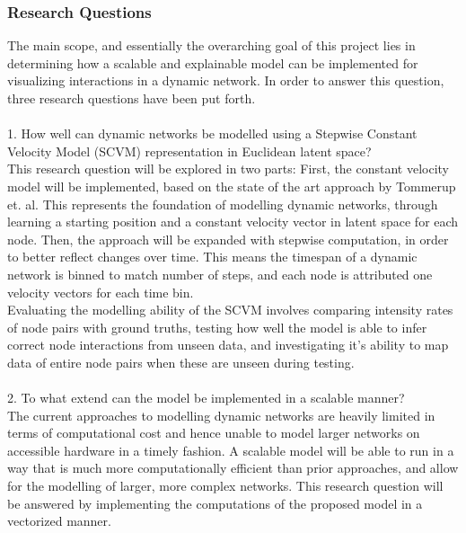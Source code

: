 \subsubsection{Research Questions} 
\label{sec:Intro:ResearchQs}
The main scope, and essentially the overarching goal of this project lies in determining how a scalable and explainable model can be implemented for visualizing interactions in a dynamic network.
In order to answer this question, three research questions have been put forth.
\\\\
1. How well can dynamic networks be modelled using a Stepwise Constant Velocity Model (SCVM) representation in Euclidean latent space?
\\
This research question will be explored in two parts:
First, the constant velocity model will be implemented, based on the state of the art approach by Tommerup et. al. \cite{Tommerup2021LearningNetworks}
This represents the foundation of modelling dynamic networks, through learning a starting position and a constant velocity vector in latent space for each node.
Then, the approach will be expanded with stepwise computation, in order to better reflect changes over time.
This means the timespan of a dynamic network is binned to match number of steps, and each node is attributed one velocity vectors for each time bin.
\\
Evaluating the modelling ability of the SCVM involves comparing intensity rates of node pairs with ground truths, testing how well the model is able to infer correct node interactions from unseen data, and investigating it's ability to map data of entire node pairs when these are unseen during testing.
\\\\
2. To what extend can the model be implemented in a scalable manner?
\\
The current approaches to modelling dynamic networks are heavily limited in terms of computational cost and hence unable to model larger networks on accessible hardware in a timely fashion.
A scalable model will be able to run in a way that is much more computationally efficient than prior approaches, and allow for the modelling of larger, more complex networks.
This research question will be answered by implementing the computations of the proposed model in a vectorized manner.
